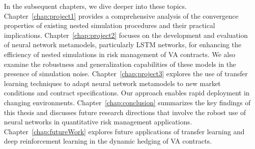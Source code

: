 In the subsequent chapters, we dive deeper into these topics.
Chapter~\ref{chap:project1} provides a comprehensive analysis of the convergence properties of existing nested simulation procedures and their practical implications.
Chapter~\ref{chap:project2} focuses on the development and evaluation of neural network metamodels, particularly LSTM networks, for enhancing the efficiency of nested simulations in risk management of VA contracts.
We also examine the robustness and generalization capabilities of these models in the presence of simulation noise.
Chapter~\ref{chap:project3} explores the use of transfer learning techniques to adapt neural network metamodels to new market conditions and contract specifications.
Our approach enables rapid deployment in changing environments.
Chapter~\ref{chap:conclusion} summarizes the key findings of this thesis and discusses future research directions that involve the robost use of neural networks in quantitative risk management applications.
Chapter~\ref{chap:futureWork} explores future applications of transfer learning and deep reinforcement learning in the dynamic hedging of VA contracts.

